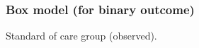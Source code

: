 \documentclass[handout]{beamer}
\begin{document}


   \begin{frame}
   \frametitle{Box model (for binary outcome)}
   \begin{center}
   \end{center}
   Standard of care group (observed).
   \end{frame}
\end{document}
